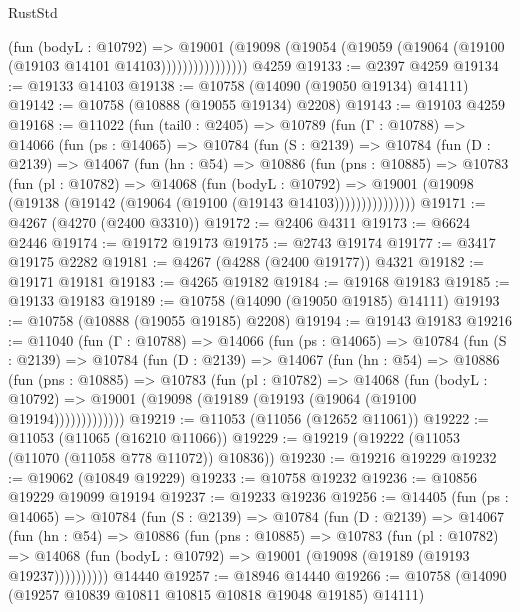 \begin{lexlean}{RustStd}
\begin{coremodule}
                      (fun (bodyL : @10792) =>
                      @19001
                        (@19098
                          (@19054 (@19059 (@19064 (@19100 (@19103 @14101 @14103))))))))))))))))
    @4259
@19133 := @2397 @4259
@19134 := @19133 @14103
@19138 := @10758 (@14090 (@19050 @19134) @14111)
@19142 := @10758 (@10888 (@19055 @19134) @2208)
@19143 := @19103 @4259
@19168 := @11022
    (fun (tail0 : @2405) =>
    @10789
      (fun (Γ : @10788) =>
      @14066
        (fun (ps : @14065) =>
        @10784
          (fun (S : @2139) =>
          @10784
            (fun (D : @2139) =>
            @14067
              (fun (hn : @54) =>
              @10886
                (fun (pns : @10885) =>
                @10783
                  (fun (pl : @10782) =>
                  @14068
                    (fun (bodyL : @10792) =>
                    @19001 (@19098 (@19138 (@19142 (@19064 (@19100 (@19143 @14103)))))))))))))))
@19171 := @4267 (@4270 (@2400 @3310))
@19172 := @2406 @4311
@19173 := @6624 @2446
@19174 := @19172 @19173
@19175 := @2743 @19174
@19177 := @3417 @19175 @2282
@19181 := @4267 (@4288 (@2400 @19177)) @4321
@19182 := @19171 @19181
@19183 := @4265 @19182
@19184 := @19168 @19183
@19185 := @19133 @19183
@19189 := @10758 (@14090 (@19050 @19185) @14111)
@19193 := @10758 (@10888 (@19055 @19185) @2208)
@19194 := @19143 @19183
@19216 := @11040
    (fun (Γ : @10788) =>
    @14066
      (fun (ps : @14065) =>
      @10784
        (fun (S : @2139) =>
        @10784
          (fun (D : @2139) =>
          @14067
            (fun (hn : @54) =>
            @10886
              (fun (pns : @10885) =>
              @10783
                (fun (pl : @10782) =>
                @14068
                  (fun (bodyL : @10792) =>
                  @19001 (@19098 (@19189 (@19193 (@19064 (@19100 @19194)))))))))))))
@19219 := @11053 (@11056 (@12652 @11061))
@19222 := @11053 (@11065 (@16210 @11066))
@19229 := @19219 (@19222 (@11053 (@11070 (@11058 @778 @11072)) @10836))
@19230 := @19216 @19229
@19232 := @19062 (@10849 @19229)
@19233 := @10758 @19232
@19236 := @10856 @19229 @19099 @19194
@19237 := @19233 @19236
@19256 := @14405
    (fun (ps : @14065) =>
    @10784
      (fun (S : @2139) =>
      @10784
        (fun (D : @2139) =>
        @14067
          (fun (hn : @54) =>
          @10886
            (fun (pns : @10885) =>
            @10783
              (fun (pl : @10782) =>
              @14068 (fun (bodyL : @10792) => @19001 (@19098 (@19189 (@19193 @19237))))))))))
    @14440
@19257 := @18946 @14440
@19266 := @10758 (@14090 (@19257 @10839 @10811 @10815 @10818 @19048 @19185) @14111)

\end{coremodule}
\end{lexlean}

